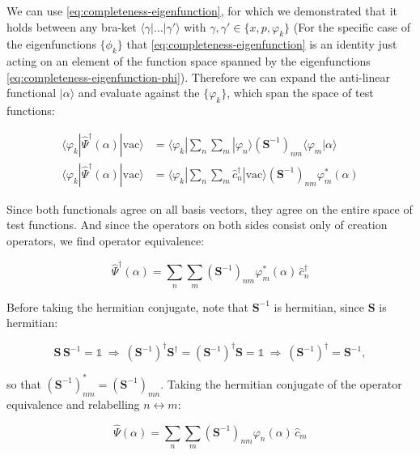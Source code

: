We can use \eqref{eq:completeness-eigenfunction}, for which we demonstrated that it
holds between any bra-ket $\langle\gamma|\dots|\gamma'\rangle$
with $\gamma,\gamma'\in\{x,p,\varphi_k\}$ (For the specific case of the eigenfunctions $\{\phi_{k}\}$ that \eqref{eq:completeness-eigenfunction}
is an identity just acting on an element of the function space spanned by the eigenfunctions \eqref{eq:completeness-eigenfunction-phi}). 
Therefore we can expand the
anti-linear functional $|\alpha\rangle$ and evaluate against the
$\{\varphi_k\}$, which span the space of test functions:

\begin{align}
\langle\varphi_k|\hat\varPsi^\dagger(\alpha)|\mathrm{vac}\rangle
&= \langle\varphi_k|\sum_n\sum_m|\varphi_n\rangle\left(\mathbf S^{-1}\right)_{nm}\langle\varphi_m|\alpha\rangle\\
\langle\varphi_k|\hat\varPsi^\dagger(\alpha)|\mathrm{vac}\rangle
&= \langle\varphi_k|\sum_n\sum_m \hat c_n^\dagger|\mathrm{vac}\rangle\left(\mathbf S^{-1}\right)_{nm}\varphi_m^*(\alpha)
\end{align}

Since both functionals agree on all basis vectors, they agree on the
entire space of test functions. And since the operators on both sides
consist only of creation operators, we find operator equivalence:

\begin{equation}
\boxed{\hat\varPsi^\dagger(\alpha) = \sum_n\sum_m\left(\mathbf S^{-1}\right)_{nm}\varphi_m^*(\alpha)\,\hat c_n^\dagger}
\end{equation}

Before taking the hermitian conjugate, note that $\mathbf S^{-1}$ is
hermitian, since $\mathbf S$ is hermitian:

\begin{equation}
\mathbf S\,\mathbf S^{-1} = \mathbb 1
\ \Longrightarrow\ \left(\mathbf S^{-1}\right)^\dagger\mathbf S^\dagger = \left(\mathbf S^{-1}\right)^\dagger\mathbf S = \mathbb 1
\ \Longrightarrow\ \left(\mathbf S^{-1}\right)^\dagger = \mathbf S^{-1},
\end{equation}

so that $\left(\mathbf S^{-1}\right)^*_{nm} = \left(\mathbf S^{-1}\right)_{mn}$.
Taking the hermitian conjugate of the operator equivalence and
relabelling $n\leftrightarrow m$:

\begin{equation}
\boxed{\hat\varPsi(\alpha) = \sum_n\sum_m\left(\mathbf S^{-1}\right)_{nm}\varphi_n(\alpha)\,\hat c_m}
\end{equation}

